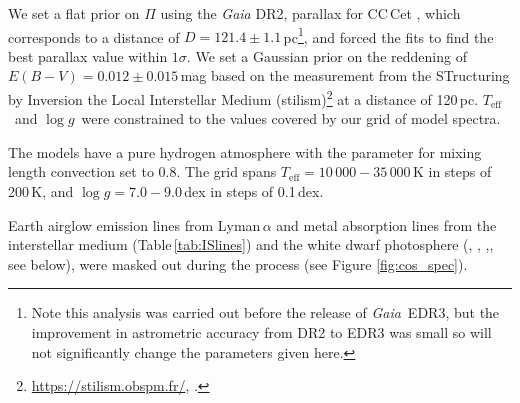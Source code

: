 \documentclass[fleqn,usenatbib]{mnras}
\newcommand{\Teff}{\mbox{$T_{\mathrm{eff}}$}}
\newcommand{\logg}{\mbox{$\log g$}}
\begin{document}
We set a flat prior on $\Pi$ using the \textit{Gaia} DR2, parallax for CC\,Cet \citep[$\Pi=8.2381\pm0.0758$\,mas, \textit{Gaia} source id~=~15207693216816512][]{gaia18-1}, which corresponds to a distance of $D=121.4\pm1.1$\,pc\footnote{Note this analysis was carried out before the release of \textit{Gaia}\, EDR3, but the improvement in astrometric accuracy from DR2 to EDR3 was small so will not significantly change the parameters given here.}, and forced the fits to find the best parallax value within $1\sigma$. We set a Gaussian prior on the reddening of $E(B-V)=0.012 \pm 0.015$\,mag based on the measurement from the STructuring by Inversion the Local Interstellar Medium (stilism)\footnote{\href{https://stilism.obspm.fr/}{https://stilism.obspm.fr/}, \citet{lallementetal14-1, lallementetal18-1, capitanioetal17-1}.} at a distance of 120\,pc. \Teff\ and \logg\ were constrained to the values covered by our grid of model spectra.

The models have a pure hydrogen atmosphere with the parameter for mixing length convection set to 0.8. The grid spans $\Teff=10\,000-35\,000$\,K in steps of 200\,K, and $\logg=7.0-9.0$\,dex in steps of 0.1\,dex.

Earth airglow emission lines from Lyman\,$\alpha$ and metal absorption lines from the interstellar medium (Table\,\ref{tab:ISlines}) and the white dwarf photosphere (, , ,, see below), were masked out during the process (see Figure \ref{fig:cos_spec}).
\end{document}
